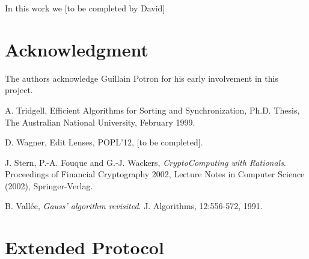 \documentclass[11pt]{llncs}
\begin{document}
In this work we [to be completed by David]

\section{Acknowledgment}

The authors acknowledge Guillain Potron for his early involvement in this project.




\begin{thebibliography}{30}

 A. Tridgell, Efficient Algorithms for Sorting and Synchronization, Ph.D. Thesis, The Australian National University, February 1999.

 D. Wagner, Edit Lenses, POPL'12, [to be completed].

 J. Stern, P.-A. Fouque and G.-J. Wackers, {\sl CryptoComputing with Rationals}. Proceedings of Financial Cryptography 2002, Lecture Notes in Computer Science (2002), Springer-Verlag. \smallskip

 B. Vall\'ee, {\sl Gauss' algorithm revisited}. J. Algorithms, 12:556-572, 1991.

\end{thebibliography}

\appendix

\section{Extended Protocol}
\end{document}
